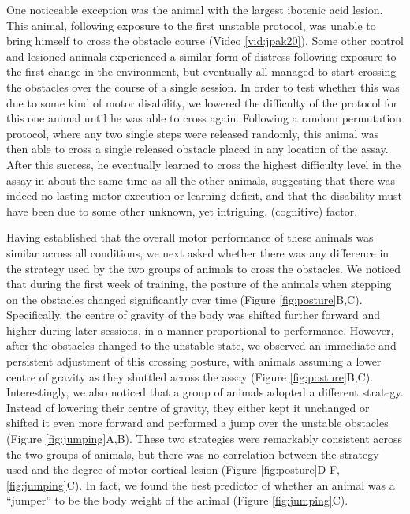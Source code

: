 One noticeable exception was the animal with the largest ibotenic acid lesion. This animal, following exposure to the first unstable protocol, was unable to bring himself to cross the obstacle course (Video \ref{vid:jpak20}). Some other control and lesioned animals experienced a similar form of distress following exposure to the first change in the environment, but eventually all managed to start crossing the obstacles over the course of a single session. In order to test whether this was due to some kind of motor disability, we lowered the difficulty of the protocol for this one animal until he was able to cross again. Following a random permutation protocol, where any two single steps were released randomly, this animal was then able to cross a single released obstacle placed in any location of the assay. After this success, he eventually learned to cross the highest difficulty level in the assay in about the same time as all the other animals, suggesting that there was indeed no lasting motor execution or learning deficit, and that the disability must have been due to some other unknown, yet intriguing, (cognitive) factor. 

Having established that the overall motor performance of these animals was similar across all conditions, we next asked whether there was any difference in the strategy used by the two groups of animals to cross the obstacles. We noticed that during the first week of training, the posture of the animals when stepping on the obstacles changed significantly over time (Figure \ref{fig:posture}B,C). Specifically, the centre of gravity of the body was shifted further forward and higher during later sessions, in a manner proportional to performance. However, after the obstacles changed to the unstable state, we observed an immediate and persistent adjustment of this crossing posture, with animals assuming a lower centre of gravity as they shuttled across the assay (Figure \ref{fig:posture}B,C). Interestingly, we also noticed that a group of animals adopted a different strategy. Instead of lowering their centre of gravity, they either kept it unchanged or shifted it even more forward and performed a jump over the unstable obstacles (Figure \ref{fig:jumping}A,B). These two strategies were remarkably consistent across the two groups of animals, but there was no correlation between the strategy used and the degree of motor cortical lesion (Figure \ref{fig:posture}D-F, \ref{fig:jumping}C). In fact, we found the best predictor of whether an animal was a ``jumper'' to be the body weight of the animal (Figure \ref{fig:jumping}C).

